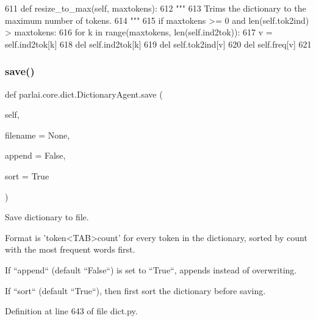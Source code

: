 \begin{DoxyCode}
611     \textcolor{keyword}{def }resize\_to\_max(self, maxtokens):
612         \textcolor{stringliteral}{"""}
613 \textcolor{stringliteral}{        Trims the dictionary to the maximum number of tokens.}
614 \textcolor{stringliteral}{        """}
615         \textcolor{keywordflow}{if} maxtokens >= 0 \textcolor{keywordflow}{and} len(self.tok2ind) > maxtokens:
616             \textcolor{keywordflow}{for} k \textcolor{keywordflow}{in} range(maxtokens, len(self.ind2tok)):
617                 v = self.ind2tok[k]
618                 del self.ind2tok[k]
619                 del self.tok2ind[v]
620                 del self.freq[v]
621 
\end{DoxyCode}
\mbox{\label{classparlai_1_1core_1_1dict_1_1DictionaryAgent_a0c6a8d8b67fe978549b328e7b7b07450}} 
\subsubsection{\texorpdfstring{save()}{save()}}
{\footnotesize\ttfamily def parlai.\+core.\+dict.\+Dictionary\+Agent.\+save (\begin{DoxyParamCaption}\item[{}]{self,  }\item[{}]{filename = {\ttfamily None},  }\item[{}]{append = {\ttfamily False},  }\item[{}]{sort = {\ttfamily True} }\end{DoxyParamCaption})}

\begin{DoxyVerb}Save dictionary to file.

Format is 'token<TAB>count' for every token in the dictionary, sorted
by count with the most frequent words first.

If ``append`` (default ``False``) is set to ``True``, appends instead of
overwriting.

If ``sort`` (default ``True``), then first sort the dictionary before saving.
\end{DoxyVerb}
 

Definition at line 643 of file dict.\+py.


